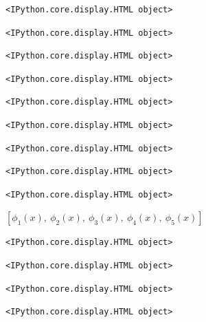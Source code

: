 \documentclass[
  11pt,
  a4paper,
]{scrbook}
\begin{document}
\begin{verbatim}
<IPython.core.display.HTML object>
\end{verbatim}

\begin{verbatim}
<IPython.core.display.HTML object>
\end{verbatim}

\begin{verbatim}
<IPython.core.display.HTML object>
\end{verbatim}

\begin{verbatim}
<IPython.core.display.HTML object>
\end{verbatim}

\begin{verbatim}
<IPython.core.display.HTML object>
\end{verbatim}

\begin{verbatim}
<IPython.core.display.HTML object>
\end{verbatim}

\begin{verbatim}
<IPython.core.display.HTML object>
\end{verbatim}

\begin{verbatim}
<IPython.core.display.HTML object>
\end{verbatim}

\begin{verbatim}
<IPython.core.display.HTML object>
\end{verbatim}

$\displaystyle \left[ \phi_{1}{\left(x \right)}, \  \phi_{2}{\left(x \right)}, \  \phi_{3}{\left(x \right)}, \  \phi_{4}{\left(x \right)}, \  \phi_{5}{\left(x \right)}\right]$

\begin{verbatim}
<IPython.core.display.HTML object>
\end{verbatim}

\begin{verbatim}
<IPython.core.display.HTML object>
\end{verbatim}

\begin{verbatim}
<IPython.core.display.HTML object>
\end{verbatim}

\begin{verbatim}
<IPython.core.display.HTML object>
\end{verbatim}
\end{document}
